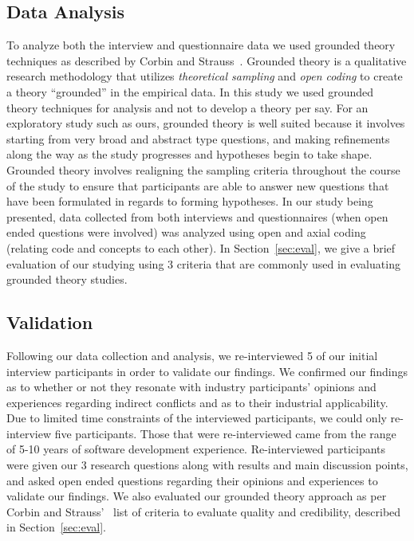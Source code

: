 \documentclass[conference]{IEEEtran}
\begin{document}
\subsection{Data Analysis}
To analyze both the interview and questionnaire data we used grounded theory techniques as described by Corbin and Strauss~\cite{Corbin:1998:SP}.
Grounded theory is a qualitative research methodology that utilizes \textit{theoretical sampling} and
\textit{open coding} to create a theory ``grounded'' in the empirical data. In this study we used grounded
theory techniques for analysis and not to develop a theory per say. For an exploratory study such as ours, grounded theory is well suited because it involves starting from very broad and abstract type questions, and
making refinements along the way as the study progresses and hypotheses begin to take shape. Grounded theory involves
realigning the sampling criteria throughout the course of the study to ensure that participants are able to answer new
questions that have been formulated in regards to forming hypotheses. In our study being presented, data collected from
both interviews and questionnaires (when open ended questions were involved) was analyzed using open and axial coding (relating
code and concepts to each other).
In Section~\ref{sec:eval}, we give a brief evaluation of our studying using
3 criteria that are commonly used in evaluating grounded theory studies.

\subsection{Validation}

Following our data collection and analysis, we re-interviewed 5 of our initial interview participants
in order to validate our findings. We confirmed our findings as to whether or not they resonate with
industry participants' opinions and experiences regarding indirect conflicts and as to their industrial
applicability. Due to limited time constraints of the interviewed participants, we could only re-interview
five participants. Those that were re-interviewed came from the range of 5-10 years of software development
experience. Re-interviewed participants were given our 3 research questions along with results and main
discussion points, and asked open ended questions regarding their opinions and experiences to validate our
findings. We also evaluated our grounded theory approach as per Corbin and Strauss'~\cite{Corbin:1998:SP}
list of criteria to evaluate quality and credibility, described in Section~\ref{sec:eval}.
\end{document}

